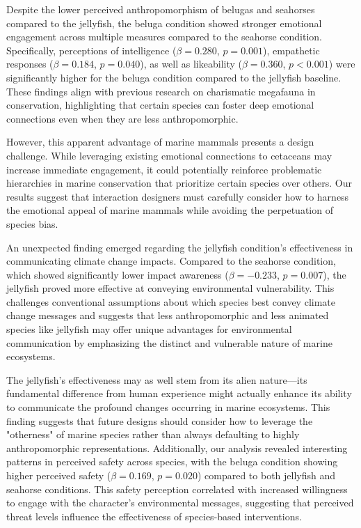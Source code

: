\documentclass[sigconf, nonacm]{acmart}
\begin{document}
Despite the lower perceived anthropomorphism of belugas and seahorses compared to the jellyfish, the beluga condition showed stronger emotional engagement across multiple measures compared to the seahorse condition. Specifically, perceptions of intelligence ($\beta = 0.280$, $p = 0.001$),  empathetic responses ($\beta = 0.184$, $p = 0.040$), as well as likeability ($\beta = 0.360$, $p < 0.001$) were significantly higher for the beluga condition compared to the jellyfish baseline. These findings align with previous research on charismatic megafauna in conservation, highlighting that certain species can foster deep emotional connections even when they are less anthropomorphic.

However, this apparent advantage of marine mammals presents a design challenge. While leveraging existing emotional connections to cetaceans may increase immediate engagement, it could potentially reinforce problematic hierarchies in marine conservation that prioritize certain species over others. Our results suggest that interaction designers must carefully consider how to harness the emotional appeal of marine mammals while avoiding the perpetuation of species bias.

An unexpected finding emerged regarding the jellyfish condition's effectiveness in communicating climate change impacts. Compared to the seahorse condition, which showed significantly lower impact awareness ($\beta = -0.233$, $p = 0.007$), the jellyfish proved more effective at conveying environmental vulnerability. This challenges conventional assumptions about which species best convey climate change messages and suggests that less anthropomorphic and less animated species like jellyfish may offer unique advantages for environmental communication by emphasizing the distinct and vulnerable nature of marine ecosystems.

The jellyfish's effectiveness may as well stem from its alien nature—its fundamental difference from human experience might actually enhance its ability to communicate the profound changes occurring in marine ecosystems. This finding suggests that future designs should consider how to leverage the "otherness" of marine species rather than always defaulting to highly anthropomorphic representations. Additionally, our analysis revealed interesting patterns in perceived safety across species, with the beluga condition showing higher perceived safety ($\beta = 0.169$, $p = 0.020$) compared to both jellyfish and seahorse conditions. This safety perception correlated with increased willingness to engage with the character's environmental messages, suggesting that perceived threat levels influence the effectiveness of species-based interventions.
\end{document}
